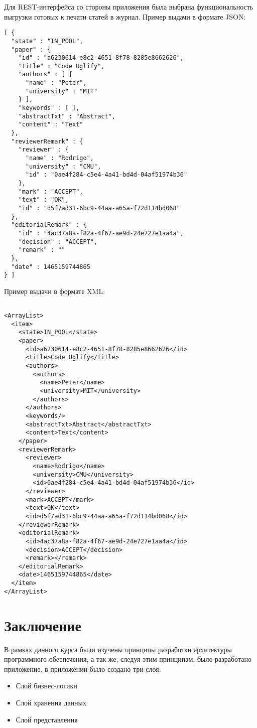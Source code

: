 Для REST-интерфейса со стороны приложения была выбрана функциональность
выгрузки готовых к печати статей в журнал. Пример выдачи в формате JSON:

\begin{verbatim}
[ {
  "state" : "IN_POOL",
  "paper" : {
    "id" : "a6230614-e8c2-4651-8f78-8285e8662626",
    "title" : "Code Uglify",
    "authors" : [ {
      "name" : "Peter",
      "university" : "MIT"
    } ],
    "keywords" : [ ],
    "abstractTxt" : "Abstract",
    "content" : "Text"
  },
  "reviewerRemark" : {
    "reviewer" : {
      "name" : "Rodrigo",
      "university" : "CMU",
      "id" : "0ae4f284-c5e4-4a41-bd4d-04af51974b36"
    },
    "mark" : "ACCEPT",
    "text" : "OK",
    "id" : "d5f7ad31-6bc9-44aa-a65a-f72d114bd068"
  },
  "editorialRemark" : {
    "id" : "4ac37a8a-f82a-4f67-ae9d-24e727e1aa4a",
    "decision" : "ACCEPT",
    "remark" : ""
  },
  "date" : 1465159744865
} ]
\end{verbatim}

Пример выдачи в формате XML:

\begin{verbatim}

<ArrayList>
  <item>
    <state>IN_POOL</state>
    <paper>
      <id>a6230614-e8c2-4651-8f78-8285e8662626</id>
      <title>Code Uglify</title>
      <authors>
        <authors>
          <name>Peter</name>
          <university>MIT</university>
        </authors>
      </authors>
      <keywords/>
      <abstractTxt>Abstract</abstractTxt>
      <content>Text</content>
    </paper>
    <reviewerRemark>
      <reviewer>
        <name>Rodrigo</name>
        <university>CMU</university>
        <id>0ae4f284-c5e4-4a41-bd4d-04af51974b36</id>
      </reviewer>
      <mark>ACCEPT</mark>
      <text>OK</text>
      <id>d5f7ad31-6bc9-44aa-a65a-f72d114bd068</id>
    </reviewerRemark>
    <editorialRemark>
      <id>4ac37a8a-f82a-4f67-ae9d-24e727e1aa4a</id>
      <decision>ACCEPT</decision>
      <remark></remark>
    </editorialRemark>
    <date>1465159744865</date>
  </item>
</ArrayList>
\end{verbatim}

\section{Заключение}\label{ux437ux430ux43aux43bux44eux447ux435ux43dux438ux435}

В рамках данного курса были изучены принципы разработки архитектуры
программного обеспечения, а так же, следуя этим принципам, было
разработано приложение. в приложении было создано три слоя:

\begin{itemize}
\tightlist
\item
  Слой бизнес-логики
\item
  Слой хранения данных
\item
  Слой представления
\end{itemize}
